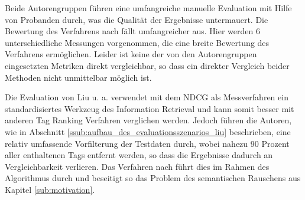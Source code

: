 Beide Autorengruppen führen eine umfangreiche manuelle Evaluation mit Hilfe von Probanden durch, was die Qualität der Ergebnisse untermauert. Die Bewertung des Verfahrens nach \cite{collectiveKnowledge} fällt umfangreicher aus. Hier werden 6 unterschiedliche Messungen vorgenommen, die eine breite Bewertung des Verfahrens ermöglichen. Leider ist keine der von den Autorengruppen eingesetzten Metriken direkt vergleichbar, so dass ein direkter Vergleich beider Methoden nicht unmittelbar möglich ist.

Die Evaluation von Liu u. a. verwendet mit dem NDCG als Messverfahren ein standardisiertes Werkzeug des Information Retrieval und kann somit besser mit anderen Tag Ranking Verfahren verglichen werden. Jedoch führen die Autoren, wie in Abschnitt \ref{ssub:aufbau_des_evaluationsszenarios_liu} beschrieben, eine relativ umfassende Vorfilterung der Testdaten durch, wobei nahezu 90 Prozent aller enthaltenen Tags entfernt werden, so dass die Ergebnisse dadurch an Vergleichbarkeit verlieren. Das Verfahren nach \cite{collectiveKnowledge} führt dies im Rahmen des Algorithmus durch und beseitigt so das Problem des semantischen Rauschens aus Kapitel \ref{sub:motivation}.
